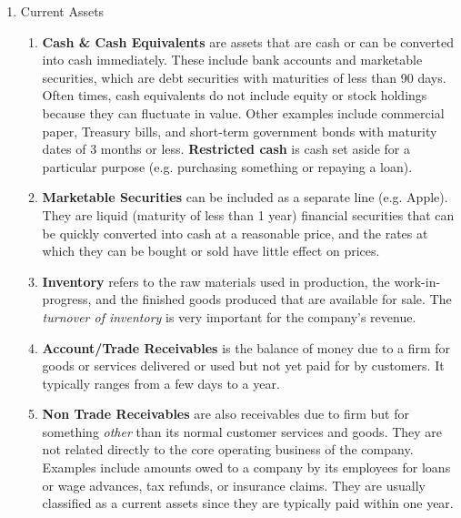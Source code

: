 \documentclass{article}
\begin{document}
\begin{enumerate}
\item
Current Assets
\begin{enumerate}
\item \textbf{Cash \& Cash Equivalents} are assets that are cash or can be converted into cash immediately. These include bank accounts and marketable securities, which are debt securities with maturities of less than 90 days. Often times, cash equivalents do not include equity or stock holdings because they can fluctuate in value. Other examples include commercial paper, Treasury bills, and short-term government bonds with maturity dates of 3 months or less. \textbf{Restricted cash} is cash set aside for a particular purpose (e.g. purchasing something or repaying a loan).
\item \textbf{Marketable Securities} can be included as a separate line (e.g. Apple). They are liquid (maturity of less than 1 year) financial securities that can be quickly converted into cash at a reasonable price, and the rates at which they can be bought or sold have little effect on prices.
\item \textbf{Inventory} refers to the raw materials used in production, the work-in-progress, and the finished goods produced that are available for sale. The \textit{turnover of inventory} is very important for the company's revenue.
\item \textbf{Account/Trade Receivables} is the balance of money due to a firm for goods or services delivered or used but not yet paid for by customers. It typically ranges from a few days to a year.
\item \textbf{Non Trade Receivables} are also receivables due to firm but for something \textit{other} than its normal customer services and goods. They are not related directly to the core operating business of the company. Examples include amounts owed to a company by its employees for loans or wage advances, tax refunds, or insurance claims. They are usually classified as a current assets since they are typically paid within one year.


\end{enumerate}
\end{enumerate}
\end{document}
